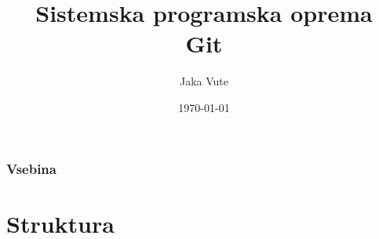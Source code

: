 \documentclass{beamer}
\title[Git]{Sistemska programska oprema\\Git} %
\author{Jaka Vute} %
\institute[UL FRI] %
{
  Univerza v Ljubljani \\
  Fakulteta za računalništvo in informatiko \\ %
\medskip
\textit{jv5542@student.uni-lj.si} %
}
\date{\today} %
\begin{document}
\begin{frame}
\titlepage %
\end{frame}

\begin{frame}
\frametitle{Vsebina} %
\tableofcontents %
\end{frame}


\section{Struktura}
\end{document}
